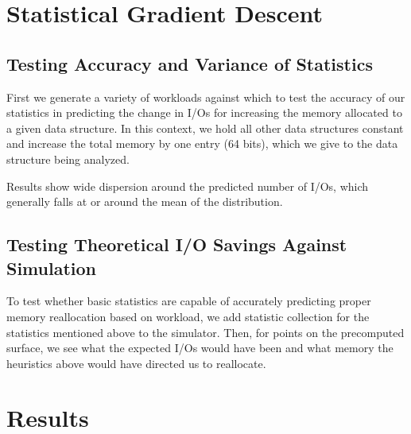 \documentclass{sig-alternate-05-2015}
\begin{document}
\section{Statistical Gradient Descent}
\subsection{Testing Accuracy and Variance of Statistics}
First we generate a variety of workloads against which to test the accuracy of our statistics in predicting the change in I/Os for increasing the memory allocated to a given data structure. In this context, we hold all other data structures constant and increase the total memory by one entry (64 bits), which we give to the data structure being analyzed. 

Results show wide dispersion around the predicted number of I/Os, which generally falls at or around the mean of the distribution.


\subsection{Testing Theoretical I/O Savings Against Simulation}
To test whether basic statistics are capable of accurately predicting proper memory reallocation based on workload, we add statistic collection for the statistics mentioned above to the simulator. Then, for points on the precomputed surface, we see what the expected I/Os would have been and what memory the heuristics above would have directed us to reallocate.

\section{Results}
\end{document}
